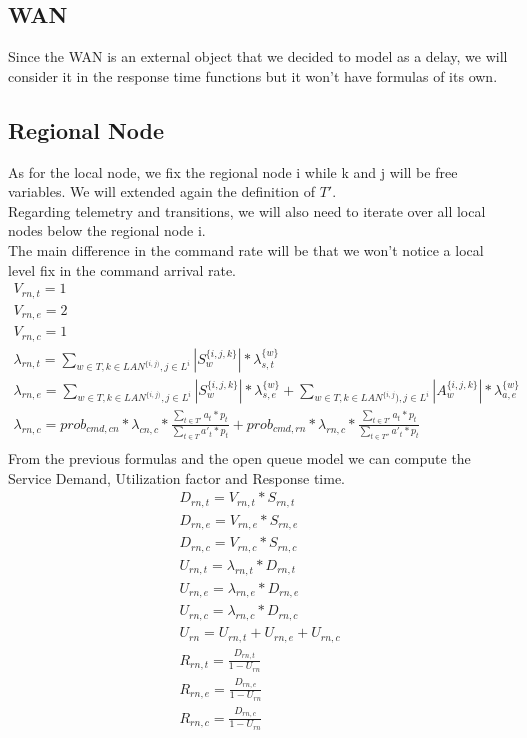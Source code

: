 \documentclass[11pt]{article}
\begin{document}
\subsection{WAN}
Since the WAN is an external object that we decided to model as a delay, we will consider it in the response time functions but it won't have formulas of its own.
\subsection{Regional Node}
As for the local node, we fix the regional node i while k and j will be free variables. We will extended again the definition of $T'$.\\
Regarding telemetry and transitions, we will also need to iterate over all local nodes below the regional node i.\\
The main difference in the command rate will be that we won't notice a local level fix in the command arrival rate.
\begin{equation}
	\begin{array}{l}
		V_{rn, t} = 1 \\
		V_{rn, e} = 2 \\ %
		V_{rn,c} = 1 \\
        \lambda_{rn, t} = \sum\limits_{w \in T,k \in LAN^{\{i,j)},j \in L^i}{| S^{\{i,j,k\}}_{w} | * \lambda^{\{w\}}_{s, t}}  \\
        \lambda_{rn, e} = \sum\limits_{w \in T,k \in LAN^{\{i,j)},j \in L^i}{| S^{\{i,j,k\}}_{w} | * \lambda^{\{w\}}_{s, e}} + \sum\limits_{w \in T,k \in LAN^{\{i,j}),j \in L^i}{| A^{\{i,j,k\}}_{w} | * \lambda^{\{w\}}_{a, e}}\\
		\lambda_{rn, c} = prob_{cmd,cn} * \lambda_{cn, c} * \frac{\sum\limits_{t \in T'}{a_{t} * p_{t}}}{\sum\limits_{t \in T}{a'_{t} * p_{t}}} + prob_{cmd,rn} * \lambda_{rn, c} *\frac{\sum\limits_{t \in T'}{a_{t} * p_{t}}}{\sum\limits_{t \in T''}{a'_{t} * p_{t}}} \\\

	\end{array}
\end{equation}
From the previous formulas and the open queue model we can compute the Service Demand, Utilization factor and Response time.
\begin{equation}
	\begin{array}{l}
		D_{rn, t} = V_{rn, t} * S_{rn, t} \\
		D_{rn, e} = V_{rn, e} * S_{rn, e} \\
		D_{rn, c} = V_{rn, c} * S_{rn, c} \\
		U_{rn, t} = \lambda_{rn, t} * D_{rn, t} \\
		U_{rn, e} = \lambda_{rn, e} * D_{rn, e} \\
		U_{rn, c} = \lambda_{rn, c} * D_{rn, c} \\
		U_{rn} = U_{rn, t} + U_{rn, e} + U_{rn, c} \\
		R_{rn, t} = \frac{D_{rn, t}}{1 - U_{rn}} \\
		R_{rn, e} = \frac{D_{rn, e}}{1 - U_{rn}} \\
		R_{rn, c} = \frac{D_{rn, c}}{1 - U_{rn}} \\
	\end{array}
\end{equation}
\end{document}
